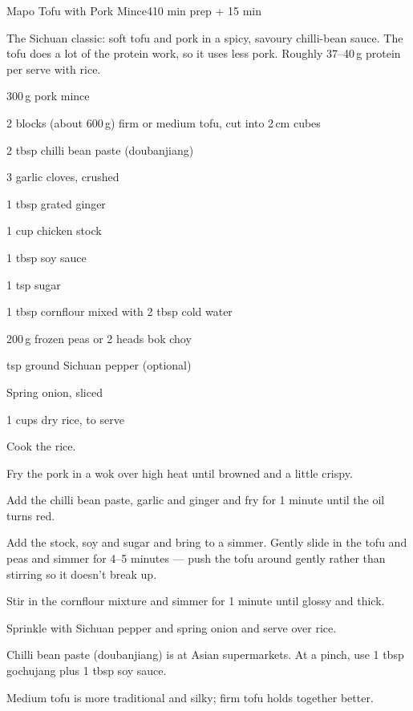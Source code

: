 \begin{recipebox}{Mapo Tofu with Pork Mince}{4}{10 min prep + 15 min}

The Sichuan classic: soft tofu and pork in a spicy, savoury chilli-bean
sauce. The tofu does a lot of the protein work, so it uses less pork.
Roughly 37--40\,g protein per serve with rice.

\begin{ingredients}
  \item 300\,g pork mince
  \item 2 blocks (about 600\,g) firm or medium tofu, cut into 2\,cm cubes
  \item 2 tbsp chilli bean paste (doubanjiang)
  \item 3 garlic cloves, crushed
  \item 1 tbsp grated ginger
  \item 1 cup chicken stock
  \item 1 tbsp soy sauce
  \item 1 tsp sugar
  \item 1 tbsp cornflour mixed with 2 tbsp cold water
  \item 200\,g frozen peas or 2 heads bok choy
  \item {} tsp ground Sichuan pepper (optional)
  \item Spring onion, sliced
  \item 1 cups dry rice, to serve
\end{ingredients}

\begin{method}
  \item Cook the rice.
  \item Fry the pork in a wok over high heat until browned and a little crispy.
  \item Add the chilli bean paste, garlic and ginger and fry for 1 minute until the oil turns red.
  \item Add the stock, soy and sugar and bring to a simmer. Gently slide in the tofu and peas and simmer for 4--5 minutes --- push the tofu around gently rather than stirring so it doesn't break up.
  \item Stir in the cornflour mixture and simmer for 1 minute until glossy and thick.
  \item Sprinkle with Sichuan pepper and spring onion and serve over rice.
\end{method}

\begin{notelist}
  \item Chilli bean paste (doubanjiang) is at Asian supermarkets. At a pinch, use 1 tbsp gochujang plus 1 tbsp soy sauce.
  \item Medium tofu is more traditional and silky; firm tofu holds together better.
\end{notelist}

\end{recipebox}
